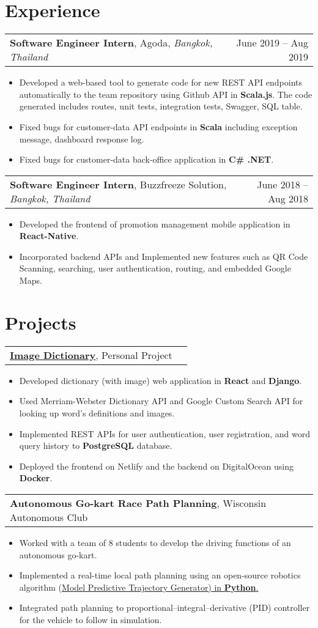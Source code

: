 \documentclass[letterpaper,11pt]{article}
\makeatletter
\newcommand{\exptitle}[4]{
  \vspace{7pt}
  \begin{tabular*}{1.00\textwidth}[t]{l@{\extracolsep{\fill}}r}
    \textbf{#1}, #2, \textit{#3} & #4 \\
  \end{tabular*}\vspace{-5pt}
}
\newcommand{\projtitle}[2]{
  \vspace{7pt}
  \begin{tabular*}{1.00\textwidth}[t]{l@{\extracolsep{\fill}}r}
    \textbf{#1}, #2 \\
  \end{tabular*}\vspace{-5pt}
}
\newcommand{\expstart}{\begin{itemize}[leftmargin=5mm]}
\newcommand{\expend}{\end{itemize}\vspace{-5pt}}
\newcommand{\expitem}[1]{\item\small{{#1 \vspace{-5pt}}}}
\makeatother
\begin{document}
\section{Experience}
 \vspace{-6pt}
  \exptitle{Software Engineer Intern}{Agoda}{Bangkok, Thailand}{June 2019 – Aug 2019}
  \expstart
    \expitem{Developed a web-based tool to generate code for new REST API endpoints automatically to the team repository using Github API in \textbf{Scala.js}. The code generated includes routes, unit tests, integration tests, Swagger, SQL table. }
    \expitem{Fixed bugs for customer-data API endpoints in \textbf{Scala} including exception message, dashboard response log.}
    \expitem{Fixed bugs for customer-data back-office application in \textbf{C\# .NET}.}
  \expend
  
  \exptitle{Software Engineer Intern}{Buzzfreeze Solution}{Bangkok, Thailand}{June 2018 – Aug 2018}
  \expstart
    \expitem{Developed the frontend of promotion management mobile application in \textbf{React-Native}. }
    \expitem{Incorporated backend APIs and Implemented new features such as QR Code Scanning, searching, user authentication, routing, and embedded Google Maps. }
  \expend

\section{Projects}
  \vspace{-6pt}
  \projtitle{\href{https://github.com/newsatit/image-dictionary}{Image Dictionary}}{Personal Project}
  \expstart
    \expitem{Developed dictionary (with image) web application in \textbf{React} and \textbf{Django}.}
    \expitem{Used Merriam-Webster Dictionary API and Google Custom Search API for looking up word's definitions and images. }
    \expitem{Implemented REST APIs for user authentication, user registration, and word query history to \textbf{PostgreSQL} database.}
    \expitem{Deployed the frontend on Netlify and the backend on DigitalOcean using \textbf{Docker}.}
  \expend
  
    \projtitle{Autonomous Go-kart Race Path Planning}{Wisconsin Autonomous Club}
  \expstart
    \expitem{Worked with a team of 8 students to develop the driving functions of an autonomous go-kart.}
    \expitem{Implemented a real-time local path planning using an open-source robotics algorithm (\href{https://github.com/AtsushiSakai/PythonRobotics}{Model Predictive Trajectory Generator) in \textbf{Python}.}}
    \expitem{Integrated path planning to proportional–integral–derivative (PID) controller for the vehicle to follow in simulation.}
  \expend
 
\end{document}
